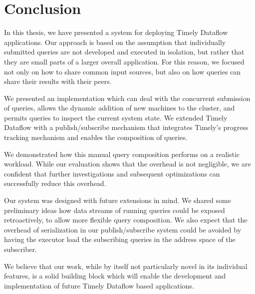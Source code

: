 \section{Conclusion}

In this thesis, we have presented a system for deploying Timely Dataflow
applications. Our approach is based on the assumption that individually
submitted queries are not developed and executed in isolation, but rather that
they are small parts of a larger overall application. For this reason, we focused 
not only on how to share common input sources, but also on how queries can
share their results with their peers.

We presented an implementation which can deal with the concurrent submission
of queries, allows the dynamic addition of new machines to the cluster, and
permits queries to inspect the current system state. We extended Timely
Dataflow with a publish/subscribe mechanism that integrates Timely's progress
tracking mechanism and enables the composition of queries.

We demonstrated how this manual query composition performs on a realistic workload.
While our evaluation shows that the overhead is not negligible, we are confident
that further investigations and subsequent optimizations can successfully
reduce this overhead.

Our system was designed with future extensions in mind. We shared some preliminary ideas
how data streams of running queries could be exposed retroactively, to allow more
flexible query composition. We also expect
that the overhead of serialization in our publish/subscribe system could be
avoided by having the executor load the subscribing queries in the address space of
the subscriber.

We believe that our work, while by itself not particularly novel in its
individual features, is a solid building block which will enable the development
and implementation of future Timely Dataflow based applications.
